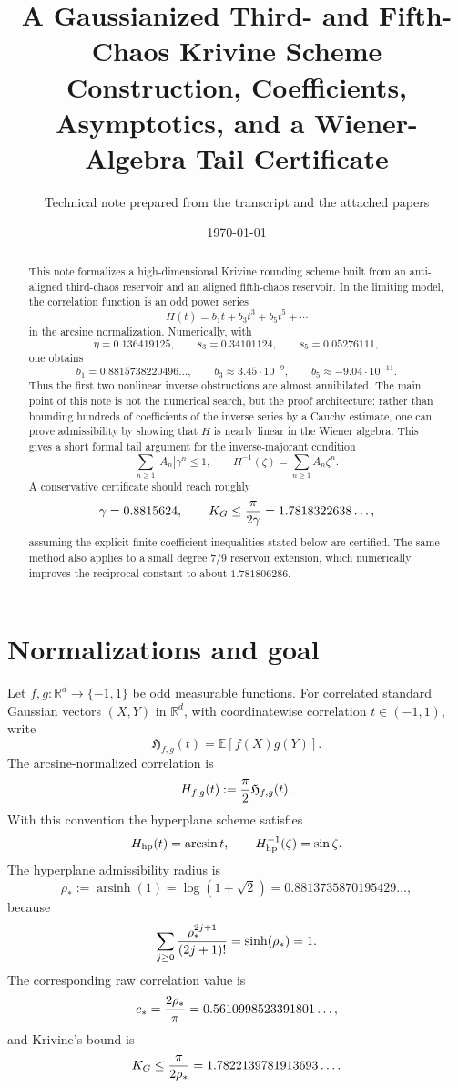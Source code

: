 \documentclass[11pt]{article}
\title{A Gaussianized Third- and Fifth-Chaos Krivine Scheme\\
\large Construction, Coefficients, Asymptotics, and a Wiener-Algebra Tail Certificate}
\author{Technical note prepared from the transcript and the attached papers}
\date{\today}
\newcommand{\R}{\mathbb{R}}
\newcommand{\E}{\mathbb{E}}
\newcommand{\1}{\mathbf{1}}
\newcommand{\asinh}{\operatorname{arsinh}}
\newcommand{\abs}[1]{\left\lvert #1\right\rvert}
\begin{document}
\maketitle

\begin{abstract}
This note formalizes a high-dimensional Krivine rounding scheme built from an anti-aligned third-chaos reservoir and an aligned fifth-chaos reservoir.  In the limiting model, the correlation function is an odd power series
\[
        H(t)=b_1t+b_3t^3+b_5t^5+\cdots
\]
in the arcsine normalization.  Numerically, with
\[
\eta=0.136419125,\qquad s_3=0.34101124,
        \qquad s_5=0.05276111,
\]
one obtains
\[
        b_1=0.8815738220496\ldots,\qquad
        b_3\approx 3.45\cdot 10^{-9},\qquad
        b_5\approx -9.04\cdot 10^{-11}.
\]
Thus the first two nonlinear inverse obstructions are almost annihilated.  The main point of this note is not the numerical search, but the proof architecture: rather than bounding hundreds of coefficients of the inverse series by a Cauchy estimate, one can prove admissibility by showing that \(H\) is nearly linear in the Wiener algebra.  This gives a short formal tail argument for the inverse-majorant condition
\[
        \sum_{n\ge 1}\abs{A_n}\gamma^n\le 1,
        \qquad H^{-1}(\zeta)=\sum_{n\ge 1}A_n\zeta^n.
\]
A conservative certificate should reach roughly
\[
        \gamma=0.8815624,
        \qquad
        K_G\le {\pi\over 2\gamma}=1.7818322638\ldots,
\]
assuming the explicit finite coefficient inequalities stated below are certified.  The same method also applies to a small degree \(7/9\) reservoir extension, which numerically improves the reciprocal constant to about \(1.781806286\).
\end{abstract}

\tableofcontents

\section{Normalizations and goal}

Let \(f,g:\R^d\to\{-1,1\}\) be odd measurable functions.  For correlated standard Gaussian vectors \((X,Y)\) in \(\R^d\), with coordinatewise correlation \(t\in(-1,1)\), write
\[
        \mathfrak H_{f,g}(t)=\E[f(X)g(Y)].
\]
The arcsine-normalized correlation is
\[
        H_{f,g}(t):={\pi\over 2}\mathfrak H_{f,g}(t).
\]
With this convention the hyperplane scheme satisfies
\[
        H_{\rm hp}(t)=\arcsin t,
        \qquad
        H_{\rm hp}^{-1}(\zeta)=\sin\zeta.
\]
The hyperplane admissibility radius is
\[
        \rho_*:=\asinh(1)=\log(1+\sqrt2)=0.8813735870195429\ldots,
\]
because
\[
        \sum_{j\ge0}{\rho_*^{2j+1}\over (2j+1)!}=\sinh(\rho_*)=1.
\]
The corresponding raw correlation value is
\[
        c_*={2\rho_*\over \pi}=0.5610998523391801\ldots,
\]
and Krivine's bound is
\[
        K_G\le {\pi\over 2\rho_*}=1.7822139781913693\ldots.
\]
\end{document}
